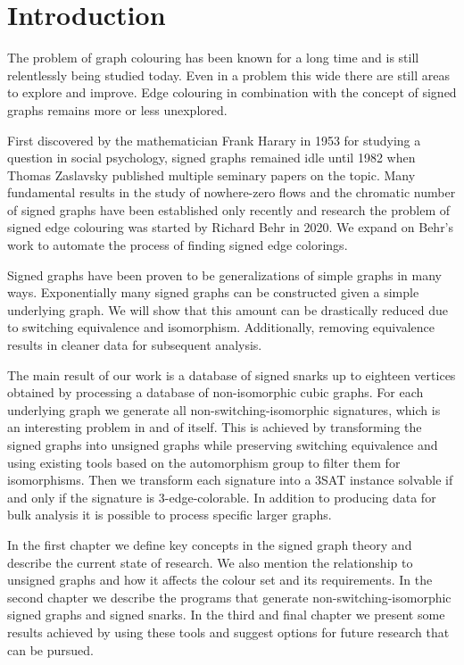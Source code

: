 \chapter*{Introduction}

The problem of graph colouring has been known for a long time and is still relentlessly being studied today. Even in a problem this wide there are still areas to explore and improve. Edge colouring in combination with the concept of signed graphs remains more or less unexplored.

First discovered by the mathematician Frank Harary in 1953 for studying a question in social psychology, signed graphs remained idle until 1982 when Thomas Zaslavsky published multiple seminary papers on the topic. Many fundamental results in the study of nowhere-zero flows and the chromatic number of signed graphs have been established only recently and research the problem of signed edge colouring was started by Richard Behr in 2020. We expand on Behr's work to automate the process of finding signed edge colorings.

Signed graphs have been proven to be generalizations of simple graphs in many ways. Exponentially many signed graphs can be constructed given a simple underlying graph. We will show that this amount can be drastically reduced due to switching equivalence and isomorphism. Additionally, removing equivalence results in cleaner data for subsequent analysis.

The main result of our work is a database of signed snarks up to eighteen vertices obtained by processing a database of non-isomorphic cubic graphs. For each underlying graph we generate all non-switching-isomorphic signatures, which is an interesting problem in and of itself. This is achieved by transforming the signed graphs into unsigned graphs while preserving switching equivalence and using existing tools based on the automorphism group to filter them for isomorphisms. Then we transform each signature into a 3SAT instance solvable if and only if the signature is 3-edge-colorable. In addition to producing data for bulk analysis it is possible to process specific larger graphs.

In the first chapter we define key concepts in the signed graph theory and describe the current state of research. We also mention the relationship to unsigned graphs and how it affects the colour set and its requirements. In the second chapter we describe the programs that generate non-switching-isomorphic signed graphs and signed snarks. In the third and final chapter we present some results achieved by using these tools and suggest options for future research that can be pursued.
